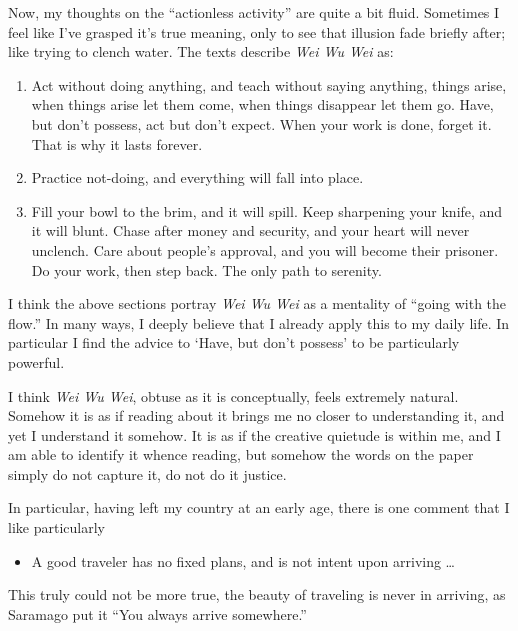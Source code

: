 \documentclass[12pt,letterpaper]{article}
\begin{document}
\begin{spacing}{2}
    Now, my thoughts on the ``actionless activity'' are quite a bit fluid.
    Sometimes I feel like I've grasped it's true meaning, only to see that
    illusion fade briefly after; like trying to clench water. The texts describe
    \emph{Wei Wu Wei} as:
    \begin{enumerate}
        \item Act without doing anything, and teach without saying anything,
            things arise, when things arise let them come, when things disappear
            let them go. Have, but don't possess, act but don't expect. When
            your work is done, forget it. That is why it lasts forever.
        \item Practice not-doing, and everything will fall into place.
        \item Fill your bowl to the brim, and it will spill. Keep sharpening
            your knife, and it will blunt. Chase after money and security, and
            your heart will never unclench. Care about people's approval, and
            you will become their prisoner. Do your work, then step back. The
            only path to serenity.
    \end{enumerate}
    I think the above sections portray \emph{Wei Wu Wei} as a mentality of
    ``going with the flow.'' In many ways, I deeply believe that I already apply
    this to my daily life. In particular I find the advice to `Have, but don't
    possess' to be particularly powerful.

    I think \emph{Wei Wu Wei}, obtuse as it is conceptually, feels extremely
    natural. Somehow it is as if reading about it brings me no closer to
    understanding it, and yet I understand it somehow. It is as if the creative
    quietude is within me, and I am able to identify it whence reading, but
    somehow the words on the paper simply do not capture it, do not do it
    justice.

    In particular, having left my country at an early age, there is one comment
    that I like particularly
    \begin{itemize}
        \item A good traveler has no fixed plans, and is not intent upon
            arriving \ldots
    \end{itemize}
    This truly could not be more true, the beauty of traveling is never in
    arriving, as Saramago put it ``You always arrive somewhere.''

    \newpage

\end{spacing}
\end{document}
